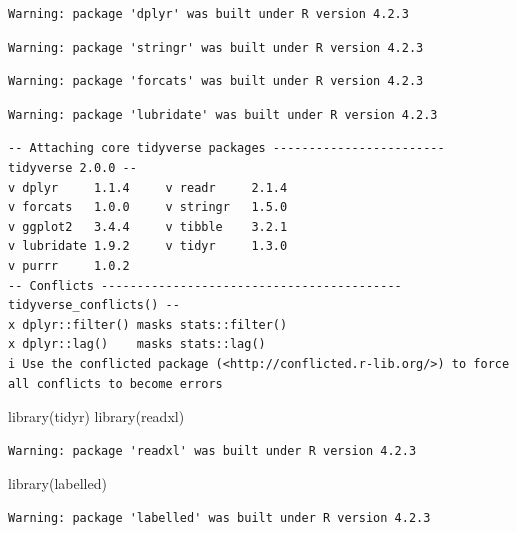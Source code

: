 \documentclass[
  letterpaper,
  DIV=11,
  numbers=noendperiod]{scrreprt}
\newenvironment{Shaded}{\begin{snugshade}}{\end{snugshade}}
\newcommand{\FunctionTok}[1]{\textcolor[rgb]{0.28,0.35,0.67}{#1}}
\newcommand{\NormalTok}[1]{\textcolor[rgb]{0.00,0.23,0.31}{#1}}
\begin{document}
\begin{verbatim}
Warning: package 'dplyr' was built under R version 4.2.3
\end{verbatim}

\begin{verbatim}
Warning: package 'stringr' was built under R version 4.2.3
\end{verbatim}

\begin{verbatim}
Warning: package 'forcats' was built under R version 4.2.3
\end{verbatim}

\begin{verbatim}
Warning: package 'lubridate' was built under R version 4.2.3
\end{verbatim}

\begin{verbatim}
-- Attaching core tidyverse packages ------------------------ tidyverse 2.0.0 --
v dplyr     1.1.4     v readr     2.1.4
v forcats   1.0.0     v stringr   1.5.0
v ggplot2   3.4.4     v tibble    3.2.1
v lubridate 1.9.2     v tidyr     1.3.0
v purrr     1.0.2     
-- Conflicts ------------------------------------------ tidyverse_conflicts() --
x dplyr::filter() masks stats::filter()
x dplyr::lag()    masks stats::lag()
i Use the conflicted package (<http://conflicted.r-lib.org/>) to force all conflicts to become errors
\end{verbatim}

\begin{Shaded}
\begin{Highlighting}[]
\FunctionTok{library}\NormalTok{(tidyr)}
\FunctionTok{library}\NormalTok{(readxl)}
\end{Highlighting}
\end{Shaded}

\begin{verbatim}
Warning: package 'readxl' was built under R version 4.2.3
\end{verbatim}

\begin{Shaded}
\begin{Highlighting}[]
\FunctionTok{library}\NormalTok{(labelled)}
\end{Highlighting}
\end{Shaded}

\begin{verbatim}
Warning: package 'labelled' was built under R version 4.2.3
\end{verbatim}
\end{document}
